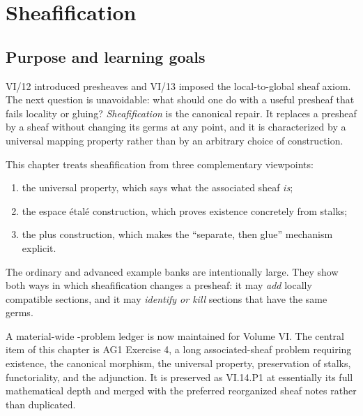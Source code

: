 
\chapter{Sheafification}
\label{ch:sheafification}
\providecommand{\id}{\operatorname{id}}
\providecommand{\PreSh}{\mathbf{PreSh}}
\providecommand{\Sh}{\mathbf{Sh}}
\providecommand{\colim}{\operatorname*{colim}}
\providecommand{\Et}{E_{\mathcal F}}

\section*{Purpose and learning goals}

VI/12 introduced presheaves and VI/13 imposed the local-to-global sheaf axiom.  The next
question is unavoidable: what should one do with a useful presheaf that fails locality or
gluing?  \emph{Sheafification} is the canonical repair.  It replaces a presheaf by a sheaf
without changing its germs at any point, and it is characterized by a universal mapping
property rather than by an arbitrary choice of construction.

This chapter treats sheafification from three complementary viewpoints:
\begin{enumerate}
\item the universal property, which says what the associated sheaf \emph{is};
\item the espace \'{e}tal\'{e} construction, which proves existence concretely from stalks;
\item the plus construction, which makes the ``separate, then glue'' mechanism explicit.
\end{enumerate}
The ordinary and advanced example banks are intentionally large.  They show both ways in
which sheafification changes a presheaf: it may \emph{add} locally compatible sections, and
it may \emph{identify or kill} sections that have the same germs.

A material-wide -problem ledger is now maintained for Volume VI.  The central item of this chapter is AG1 Exercise 4, a long associated-sheaf problem requiring existence,
the canonical morphism, the universal property, preservation of stalks, functoriality, and
the adjunction.  It is preserved as VI.14.P1 at essentially its full mathematical depth and
merged with the preferred reorganized sheaf notes rather than duplicated.

